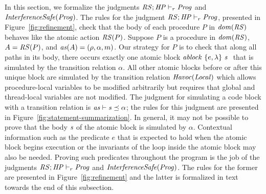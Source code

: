 In this section, we formalize the judgments $\mathit{RS};\mathit{HP} \vdash_r \mathit{Prog}$ and $\mathit{InterferenceSafe}(\mathit{Prog})$.
The rules for the judgment $\mathit{RS};\mathit{HP} \vdash_r \mathit{Prog}$, presented in Figure~\ref{fig:refinement}, check that the body of 
each procedure $P$ in $\mathit{dom}(\mathit{RS})$ behaves like the atomic action $\mathit{RS}(P)$.  
Suppose $P$ is a procedure in $\mathit{dom}(\mathit{RS})$, $A = \mathit{RS}(P)$, and $\mathit{as}(A) = (\rho, \alpha, m)$.
Our strategy for $P$ is to check that along all paths in its body, there occurs exactly one atomic block 
$\mathit{ablock}\ {\{e,\lambda\}}\ {\mathit{s}}\ $ that is simulated by the transition relation $\alpha$.
All other atomic blocks before or after this unique block are simulated by the transition relation $\mathit{Havoc}(\mathit{Local})$ 
which allows procedure-local variables to be modified arbitrarily but requires that global and thread-local variables are not modified.
The judgment for simulating a code block with a transition relation is $\mathit{as} \vdash \mathit{s} \preceq \alpha$; the rules for this judgment 
are presented in Figure~\ref{fig:statement-summarization}.
In general, it may not be possible to prove that the body $\mathit{s}$ of the atomic block is simulated by $\alpha$.
Contextual information such as the predicate $e$ that is expected to hold when the atomic block begins execution or the invariants
of the loop inside the atomic block may also be needed.
Proving such predicates throughout the program is the job of the judgments $\mathit{RS};\mathit{HP} \vdash_r \mathit{Prog}$ and $\mathit{InterferenceSafe}(\mathit{Prog})$.
The rules for the former are presented in Figure~\ref{fig:refinement} and the latter is formalized in text towards the end of this 
subsection.


